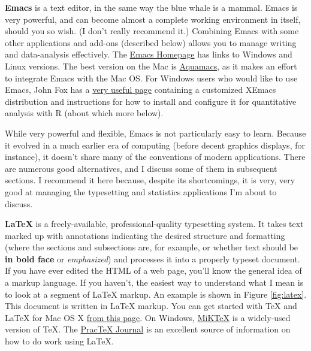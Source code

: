 \documentclass[11pt,article]{memoir}
\begin{document}
\smallskip

\textbf{Emacs} is a text editor, in the same way the blue whale is a mammal. Emacs is very powerful, and can become almost a complete working environment in itself, should you so wish. (I don't really recommend it.) Combining Emacs with some other applications and add-ons (described below) allows you to manage writing and data-analysis effectively. The \href{http://www.gnu.org/software/emacs/}{Emacs Homepage} has links to Windows and Linux versions. The best version on the Mac is \href{http://aquamacs.org/}{Aquamacs}, as it makes an effort to integrate Emacs with the Mac OS. For Windows users who would like to use Emacs, John Fox has a
\href{http://socserv.mcmaster.ca/jfox/Books/Companion/ESS/}{very useful page}
containing a customized XEmacs distribution and instructions for how to install and
configure it for quantitative analysis with R (about which more below).

While very powerful and flexible, Emacs is not particularly easy to learn. Because it evolved in a much  earlier era of computing (before decent graphics displays, for instance), it doesn't share many of the conventions of modern applications. There are numerous good alternatives, and I discuss some of them in subsequent sections. I recommend it here because, despite its shortcomings, it is very, very good at managing the typesetting and statistics applications I'm about to discuss.

\smallskip

\textbf{LaTeX} is a freely-available, professional-quality typesetting system. It takes text marked up with annotations indicating the desired structure and formatting (where the sections and subsections are, for example, or whether text should be \textbf{in bold face} or \emph{emphasized}) and processes it into a properly typeset document. If you have ever edited the HTML of a web page, you'll know the general idea of a markup language. If you haven't, the easiest way to understand what I mean is to look at a segment of LaTeX markup. An example is shown in Figure \ref{fig:latex}. This document is written in LaTeX markup. You can get started with TeX and LaTeX for Mac OS X \href{http://tug.org/mactex/}{from this page}. On Windows, \href{http://www.miktex.org/}{MiKTeX} is a widely-used version of TeX. The \href{http://www.tug.org/pracjourn/}{PracTeX Journal} is an excellent source of information on how to do work using LaTeX. 
\end{document}
